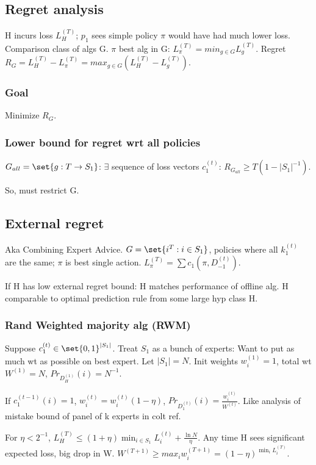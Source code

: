 \documentclass[10pt]{amsart}
\begin{document}
\subsection{Regret analysis}
H incurs loss $L_{H}^{(T)}$; $p_{1}$ sees simple policy $\pi$ would have had much lower loss. Comparison class of algs G. $\pi$ best alg in G: $L_{\pi}^{(T)} = min_{g \in G} L_{g}^{(T)}$. Regret $R_{G} = L_{H}^{(T)} - L_{\pi}^{(T)} = max_{g \in G} (L_{H}^{(T)} - L_{g}^{(T)})$.

\subsubsection{Goal}
Minimize $R_{G}$.

\subsubsection{Lower bound for regret wrt all policies}
$G_{all} = \set{g: T \to S_{1}}$: $\exists$ sequence of loss vectors $c_{1}^{(t)}$: $R_{G_{all}} \geq T(1-|S_{1}|^{-1})$.

So, must restrict G.

\subsection{External regret}
Aka Combining Expert Advice. $G = \set{i^{T} : i \in S_{1}}$, policies where all $k_{1}^{(t)}$ are the same; $\pi$ is best single action. $L_{\pi}^{(T)} = \sum c_{1}(\pi, D_{-1}^{(t)})$.

If H has low external regret bound: H matches performance of offline alg. \why  H comparable to optimal prediction rule from some large hyp class H. \why

\subsubsection{Rand Weighted majority alg (RWM)}
Suppose $c_{1}^{(t)} \in \set{0,1}^{|S_{1}|}$. Treat $S_{1}$ as a bunch of experts: Want to put as much wt as possible on best expert. Let $|S_{1}| = N$. Init weights $w_{i}^{(1)} = 1$, total wt $W^{(1)} = N$, $Pr_{D_{H}^{(1)}}(i) = N^{-1}$.

If $c_{1}^{(t-1)}(i) = 1$, $w_{i}^{(t)} = w_{i}^{(t)}(1-\eta)$, $Pr_{D_{1}^{(t)}}(i) = \frac{w_{i}^{(t)}}{W^{(t)}}$. \why Like analysis of mistake bound of panel of k experts in colt ref.

For $\eta < 2^{-1}$, $L_{H}^{(T)} \leq (1+ \eta) \min_{i \in S_{1}}L_{i}^{(t)} + \frac{\ln N}{\eta}$. Any time H sees significant expected loss, big drop in W. $W^{(T+1)} \geq max_{i}w_{i}^{(T+1)} = (1-\eta)^{\min_{i}L_{i}^{(T)}}$. \tbc
\end{document}
